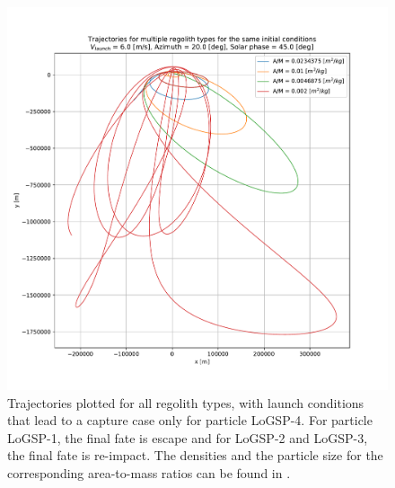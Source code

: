 \begin{figure}[htb]
\centering
\captionsetup{justification=centering}
\includegraphics[width=\textwidth, height=0.5\textheight, keepaspectratio=true]{longest_edge_perturbations/multiple_regolith_types/2d_traj_6ms_20Azim_45SolarPhase.pdf}
\caption{Trajectories plotted for all regolith types, with launch conditions that lead to a capture case only for particle LoGSP-4. For particle LoGSP-1, the final fate is escape and for LoGSP-2 and LoGSP-3, the final fate is re-impact. The densities and the particle size for the corresponding area-to-mass ratios can be found in .}
\label{fig:allRegolith_traj_6ms_20Azim_45solarPhase}
\end{figure}
\FloatBarrier


